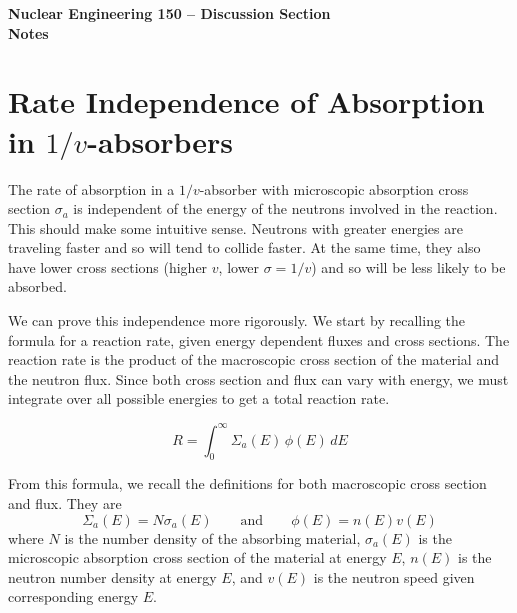 \documentclass{report}
\begin{document}
\begin{center}
\textbf{\large Nuclear Engineering 150 -- Discussion Section}\\ 
\textbf{Notes}
\end{center}


\section*{Rate Independence of Absorption in $1/v$-absorbers} 

The rate of absorption in a $1/v$-absorber with microscopic absorption cross section $\sigma_a$ is independent of the energy of the neutrons involved in the reaction. This should make some intuitive sense. Neutrons with greater energies are traveling faster and so will tend to collide faster. At the same time, they also have lower cross sections (higher $v$, lower $\sigma = 1/v$) and so will be less likely to be absorbed. 

We can prove this independence more rigorously. We start by recalling the formula for a reaction rate, given energy dependent fluxes and cross sections. The reaction rate is the product of the macroscopic cross section of the material and the neutron flux. Since both cross section and flux can vary with energy, we must integrate over all possible energies to get a total reaction rate.

\begin{equation}
\label{reactionrate}
R = \int_0^{\infty} \Sigma_a(E) \, \phi(E) \, dE
\end{equation}

From this formula, we recall the definitions for both macroscopic cross section and flux. They are
$$ \Sigma_a(E) = N \sigma_a(E) \qquad\text{and}\qquad \phi(E) = n(E) v(E) $$
where $N$ is the number density of the absorbing material, $\sigma_a(E)$ is the microscopic absorption cross section of the material at energy $E$, $n(E)$ is the neutron number density at energy $E$, and $v(E)$ is the neutron speed given corresponding energy $E$. 
\end{document}
